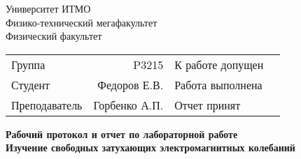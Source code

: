 \begin{titlepage}
\thispagestyle{firststyle}
\begin{center}
    Университет ИТМО \\
    Физико-технический мегафакультет \\
    Физический факультет \\
\end{center}
\vspace{1cm}
\begin{center}
    \begin{tabular}{ l r l c }
        Группа & P3215 & К работе допущен & \hspace{2cm}  \\\cline{4-4}
        Студент & Федоров Е.В. & Работа выполнена & \hspace{2cm} \\\cline{4-4}
        Преподаватель & Горбенко А.П. & Отчет принят & \hspace{2cm} \\\cline{4-4}
    \end{tabular}
\end{center}

\vspace{2cm}

\begin{center}
    \Large
    \textbf{Рабочий протокол и отчет по
        лабораторной работе 
    }
    \\
    \huge
    \textbf{Изучение свободных затухающих электромагнитных колебаний}
\end{center}
\end{titlepage}
